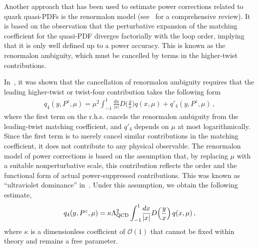 Another approach that has been used to estimate power corrections related to quark quasi-PDFs is the
renormalon model (see~\cite{Beneke:1998ui} for a comprehensive review).
%
It is based on the observation that the perturbative expansion of the matching coefficient for the quasi-PDF diverges factorially with the loop order, implying that it is only well defined up to a power accuracy. This is known as the renormalon ambiguity, which must be cancelled by terms in the higher-twist contributions.


In~\cite{Braun:2018brg}, it was shown that the cancellation of renormalon ambiguity requires that the leading higher-twist or twist-four contribution takes the following form
\begin{align}
	\label{eq:Q4-cutoff}
	{q}_4(y,P^z,\mu) = \mu^2 \int_{-1}^1 \!\frac{dx}{|x|} D\Big(\frac{y}{x}\Big) q(x,\mu) + q'_4(y,P^z,\mu)\,,
\end{align}
where the first term on the r.h.s. cancels the renormalon ambiguity from the leading-twist matching coefficient, and $q'_4$ depends on $\mu$ at most logarithmically. Since the first term is to merely cancel similar contributions in the matching coefficient, it does not contribute to any physical observable. The renormalon model of power corrections \cite{Beneke:1995pq,Dokshitzer:1995qm,Dasgupta:1996hh,Dasgupta:1996ki,Beneke:1997sr,Braun:2004bu} is based on the assumption that, by replacing $\mu$ with a suitable nonperturbative scale, this contribution reflects the order and the functional form of actual power-suppressed contributions. This was known as ``ultraviolet dominance'' in~\cite{Braun:1995tp,Beneke:1998ui,Beneke:2000kc}. Under this assumption, we obtain the following estimate,
\begin{equation}
	{q}_4(y,P^z,\mu) = \kappa
	\Lambda_{\rm QCD}^2 \int_{-1}^1 \!\frac{dx}{|x|} D\Big(\frac{y}{x}\Big)\, q(x,\mu)\,,
	\label{UV_Lambda_int}
\end{equation}
where $\kappa$ is a dimensionless coefficient of $\mathcal O(1)$ that cannot be fixed within theory and remains a free parameter.


